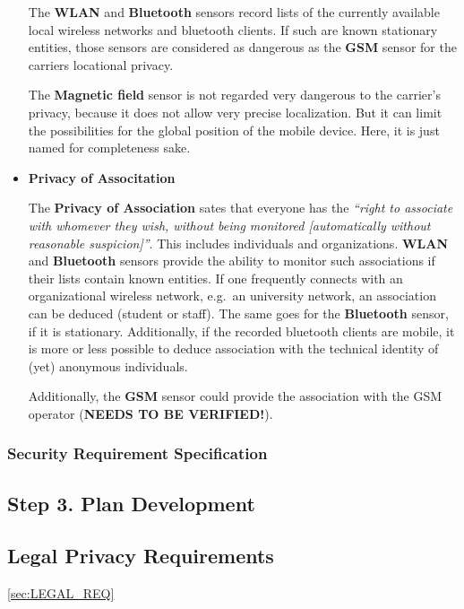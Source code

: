 \begin{itemize}
The \textbf{WLAN} and \textbf{Bluetooth} sensors record lists of the currently available local wireless networks and bluetooth clients.
If such are known stationary entities, those sensors are considered as dangerous as the \textbf{GSM} sensor for the carriers locational privacy.

The \textbf{Magnetic field} sensor is not regarded very dangerous to the carrier's privacy, because it does not allow very precise localization.
But it can limit the possibilities for the global position of the mobile device.
Here, it is just named for completeness sake.

\item \textbf{Privacy of Associtation}

The \textbf{Privacy of Association} sates that everyone has the \emph{``right to associate with whomever they wish, without being monitored [automatically without reasonable suspicion]''}.
This includes individuals and organizations.
\textbf{WLAN} and \textbf{Bluetooth} sensors provide the ability to monitor such associations if their lists contain known entities.
If one frequently connects with an organizational wireless network, e.g.~an university network, an association can be deduced (student or staff). The same goes for the \textbf{Bluetooth} sensor, if it is stationary.
Additionally, if the recorded bluetooth clients are mobile, it is more or less possible to deduce association with the technical identity of (yet) anonymous individuals.

Additionally, the \textbf{GSM} sensor could provide the association with the GSM operator (\textbf{NEEDS TO BE VERIFIED!}).

\end{itemize}



\subsubsection{Security Requirement Specification}

\subsection{Step 3. Plan Development}

\subsection{Legal Privacy Requirements} \ref{sec:LEGAL_REQ}

